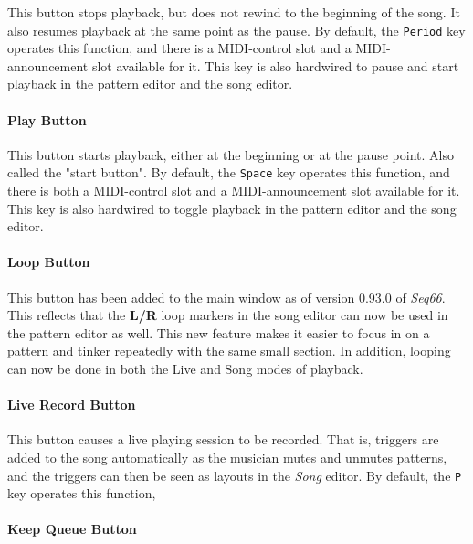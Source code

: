 \documentclass[
 11pt,
 twoside,
 a4paper,
 final                                 %
]{article}
\begin{document}
   This button stops playback, but does not rewind to the beginning of the song.
   It also resumes playback at the same point as the pause.
   By default, the \texttt{Period} key operates this function,
   and there is a MIDI-control slot and a MIDI-announcement slot available for it.
   This key is also hardwired to pause and start playback in the pattern editor and
   the song editor.

\paragraph{Play Button}
\label{paragraph:introduction_play_button}

   This button starts playback, either at the beginning or at the pause point.
   Also called the "start button".
   By default, the \texttt{Space} key operates this function,
   and there is both a MIDI-control slot and a MIDI-announcement slot
   available for it.
   This key is also hardwired to toggle playback in the pattern editor and the
   song editor.

\paragraph{Loop Button}
\label{paragraph:introduction_loop_button}

   This button has been added to the main window as of version 0.93.0 of
   \textsl{Seq66}.
   This reflects that the \textbf{L/R} loop markers in the song editor can now
   be used in the pattern editor as well.  This new feature makes it easier to
   focus in on a pattern and tinker repeatedly with the same small section.
   In addition, looping can now be done in both the Live and Song modes of
   playback.

\paragraph{Live Record Button}
\label{paragraph:introduction_live_record_button}

   This button causes a live playing session to be recorded.
   That is, triggers are added to the song automatically as the musician mutes
   and unmutes patterns, and the triggers can then be
   seen as layouts in the \textsl{Song} editor.
   By default, the \texttt{P} key operates this function,

\paragraph{Keep Queue Button}
\label{paragraph:introduction_keep_queue_button}
\end{document}
